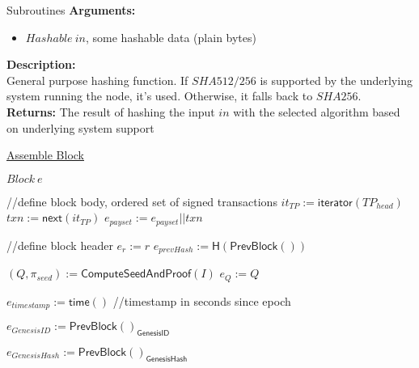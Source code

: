 \documentclass[10pt,a4paper]{article}
\begin{document}
\begin{section}{Subroutines}
\noindent \textbf{Arguments:}
\begin{itemize}
    \item $Hashable \ in$, some hashable data (plain bytes)
  \end{itemize}

\noindent \textbf{Description:}\\
General purpose hashing function. If $SHA512/256$ is supported by the underlying system running the node, it's used.
Otherwise, it falls back to $SHA256$.\\

\noindent \textbf{Returns:}
    The result of hashing the input $in$ with the selected algorithm based on underlying system support


\begin{algorithm}[H]
    \caption{\underline{Assemble Block}}
    \label{algo:assemble-block}
    \begin{algorithmic}[1]

    \State $Block \ e$

    \State //define block body, ordered set of signed transactions
    \State $it_{TP} := \mathsf{iterator}(TP_{head})$
        \State $txn := \mathsf{next}(it_{TP})$
            \State $e_{payset} :=  e_{payset}||txn$ \\
        \EndIf
    \EndWhile

    //define block header
    \State $e_{r} := r$
    \State $e_{prevHash} := \mathsf{H(PrevBlock())}$
    
    \State $(Q, \pi_{seed}) := \mathsf{ComputeSeedAndProof}(I)$
    \State $e_{Q} := Q$

    \State $e_{timestamp} := \mathsf{time}()$ //timestamp in seconds since epoch

    \State $e_{GenesisID} := \mathsf{PrevBlock()_{GenesisID}}$%

    \State $e_{GenesisHash} := \mathsf{PrevBlock()_{GenesisHash}}$ %



\end{algorithmic}
\end{algorithm}
\end{section}
\end{document}

